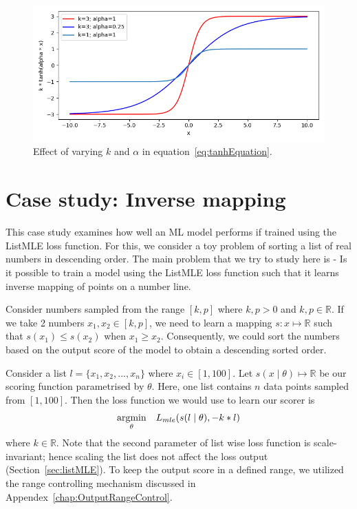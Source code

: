 \documentclass[12pt, twoside, ngerman]{report}
\begin{document}
\begin{figure}[htb]
  \centering
    \includegraphics[scale=0.5]{images/tanhGraph}
    \caption{Effect of varying $k$ and $\alpha$ in equation~\ref{eq:tanhEquation}.}
    \label{fig:tanhGraph}
\end{figure}


\chapter{Case study: Inverse mapping}
\label{chap:caseStudy}

This case study examines how well an ML model performs if trained using the ListMLE loss function. For this, we consider a toy problem of sorting a list of real numbers in descending order. The main problem that we try to study here is - Is it possible to train a model using the ListMLE loss function such that it learns inverse mapping of points on a number line.

Consider numbers sampled from the range $[k,  p]$ where $k,p > 0$ and  $k,p \in \mathbb{R}$.
If we take 2 numbers $x_1, x_2 \in [k,  p]$,  we need to learn a mapping $s: x \mapsto \mathbb{R}$ such that $s(x_1) \leq s(x_2)$ when $x_1 \geq x_2$.
Consequently, we could sort the numbers based on the output score of the model to obtain a descending sorted order.

Consider a list $l = \{x_1, x_2, ..., x_n\}$ where $x_i \in [1, 100]$.
Let $s(x \mid \theta) \mapsto \mathbb{R}$ be our scoring function parametrised by $\theta$.
Here, one list contains $n$ data points sampled from $[1, 100]$.
Then the loss function we would use to learn our scorer is
\begin{equation}
\underset{\theta}{\rm argmin} \quad L_{mle}(s(l \mid \theta),  - k * l)
\end{equation}
where $k \in \mathbb{R}$.
Note that the second parameter of list wise loss function is scale-invariant; hence scaling the list does not affect the loss output (Section~\ref{sec:listMLE}).
To keep the output score in a defined range, we utilized the range controlling mechanism discussed in Appendex~\ref{chap:OutputRangeControl}.
\end{document}
